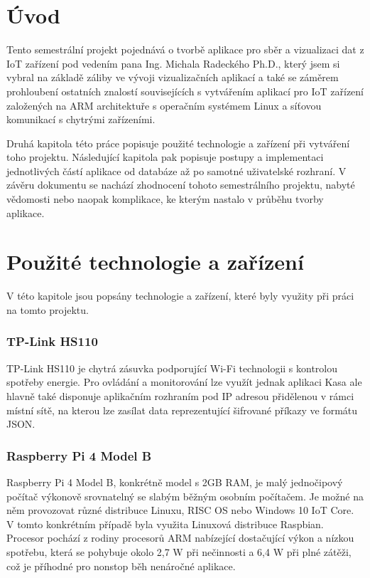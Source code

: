 \documentclass[czech,master,dept460,male,cpp,cpdeclaration,oneside]{diploma}
\begin{document}
\MakeTitlePages

\section{Úvod}
\label{sec:Introduction}
Tento semestrální projekt pojednává o tvorbě aplikace pro sběr a vizualizaci dat z IoT zařízení pod vedením pana Ing. Michala Radeckého Ph.D., který jsem si vybral na základě záliby ve vývoji vizualizačních aplikací a také se záměrem prohloubení ostatních znalostí souvisejících s vytvářením aplikací pro IoT zařízení založených na ARM architektuře s operačním systémem Linux a síťovou komunikací s chytrými zařízeními.

Druhá kapitola této práce popisuje použité technologie a zařízení při vytváření toho projektu. Následující kapitola pak popisuje postupy a implementaci jednotlivých částí aplikace od databáze až po samotné uživatelské rozhraní. V závěru dokumentu se nachází zhodnocení tohoto semestrálního projektu, nabyté vědomosti nebo naopak komplikace, ke kterým nastalo v průběhu tvorby aplikace.

\clearpage

\section{Použité technologie a zařízení}
V této kapitole jsou popsány technologie a zařízení, které byly využity při práci na tomto projektu.

\subsubsection*{TP-Link HS110}
TP-Link HS110\autocite{HS110} je chytrá zásuvka podporující Wi-Fi technologii s kontrolou spotřeby energie. Pro ovládání a monitorování lze využít jednak aplikaci Kasa ale hlavně také disponuje aplikačním rozhraním pod IP adresou přidělenou v rámci místní sítě, na kterou lze zasílat data reprezentující šifrované příkazy ve formátu JSON.

\subsubsection*{Raspberry Pi 4 Model B}
Raspberry Pi 4 Model B\autocite{PI}, konkrétně model s 2GB RAM, je malý jednočipový počítač výkonově srovnatelný se slabým běžným osobním počítačem. Je možné na něm provozovat různé distribuce Linuxu, RISC OS nebo Windows 10 IoT Core. V tomto konkrétním případě byla využita Linuxová distribuce Raspbian. Procesor pochází z rodiny procesorů ARM nabízející dostačující výkon a nízkou spotřebu, která se pohybuje okolo 2,7 W při nečinnosti a 6,4 W při plné zátěži, což je příhodné pro nonstop běh nenáročné aplikace.
\end{document}
